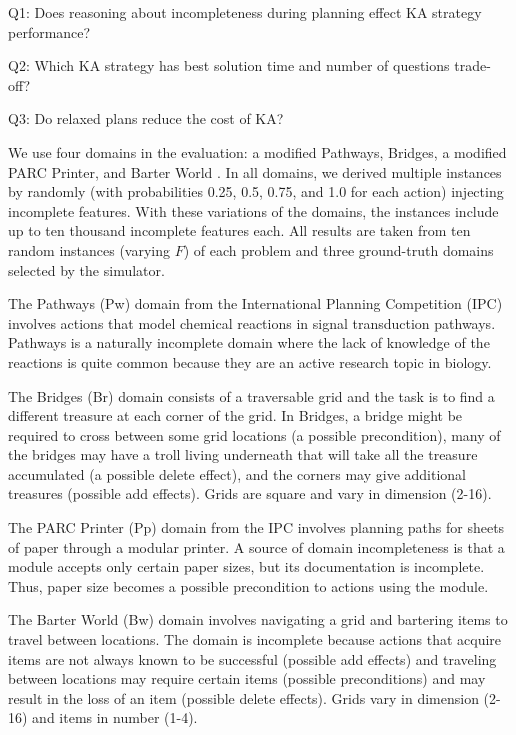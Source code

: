 \documentclass{article}
\begin{document}
\begin{packed_itemize}
  \item Q1: Does reasoning about incompleteness during planning 
  effect KA strategy performance?
  \item Q2: Which KA strategy has best solution time and
  number of questions trade-off?
  \item Q3: Do relaxed plans reduce the cost of KA?
\end{packed_itemize}



 We use four domains in the evaluation: a modified Pathways,
Bridges,  a modified PARC Printer, and Barter World \citep{bryce-icaps11}.  In
all domains, we derived multiple instances by randomly (with probabilities 0.25,
0.5, 0.75, and 1.0 for each action) injecting incomplete  features.   
With these variations of the domains, the instances include up to ten thousand
incomplete  features each. All results are taken from ten random instances
(varying $F$) of each problem and three ground-truth domains selected by the
simulator.

The Pathways (Pw) domain from the International Planning Competition  (IPC) involves actions that model chemical reactions in signal
transduction pathways.  Pathways is a naturally incomplete domain where the lack
of knowledge of the reactions is quite common because they are an active
research topic in biology.  

The Bridges (Br) domain consists of a traversable grid and the task is to find a
different treasure at each corner of the grid. In Bridges,
a bridge might be required  to cross between some grid locations (a possible
precondition), many of the bridges may have a troll living
underneath that will take all the treasure accumulated (a possible delete
effect), and the corners may give additional treasures (possible add
effects).  Grids are square and vary in dimension (2-16).

The PARC Printer (Pp) domain from the IPC involves planning paths for sheets of
paper through a modular printer.  A source of domain incompleteness is that a module
accepts only certain paper sizes, but its documentation is incomplete.  Thus,
paper size becomes a possible precondition to actions using the module.

The Barter World (Bw) domain involves navigating a grid and bartering items to
travel between locations.  The domain is incomplete because actions that acquire
 items are not always known to be successful (possible add effects) and traveling between locations may require
certain items (possible preconditions) and may result in the loss of an item
(possible delete effects). Grids vary in dimension (2-16) and items
in number (1-4).
\end{document}

